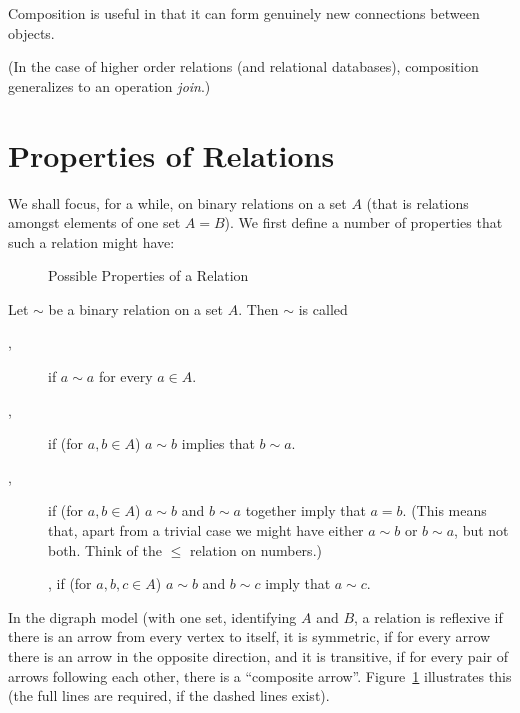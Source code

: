 Composition is useful in that it can form genuinely new connections between
objects.

(In the case of higher order relations (and relational databases),
composition generalizes to an operation {\em join}.)

\section{Properties of Relations}

We shall focus, for a while, on binary relations on a set $A$ (that is
relations amongst elements of one set $A=B$). We first
define a number of
properties that such a relation might have:
\begin{figure}
\begin{center}
\end{center}
\caption{Possible Properties of a Relation}
\label{figreppropsdigraph}
\end{figure}
\begin{defn}
Let $\sim$ be a binary relation on a set $A$. Then $\sim$ is called
\begin{description}
\item[,] if $a\sim a$ for every $a\in A$.
\item[,] if (for $a,b\in A$) $a\sim b$ implies that $b\sim a$.
\item[,] if (for $a,b\in A$) $a\sim b$ and $b\sim a$ together
imply that $a=b$. (This means that, apart from a trivial case we might have either
$a\sim b$ or $b\sim a$, but not both. Think of the $\le$ relation on numbers.)
\item[], if (for $a,b,c\in A$) $a\sim b$ and $b\sim c$ imply that
$a\sim c$.
\end{description}
\end{defn}
In the digraph model (with one set, identifying $A$ and $B$, a relation is
reflexive if there is an arrow from every vertex to itself, it is symmetric,
if for every arrow there is an arrow in the opposite direction, and it is
transitive, if for every pair of arrows following each other, there is a
``composite arrow''. Figure~\ref{figreppropsdigraph} illustrates this (the full
lines are required, if the dashed lines exist).

